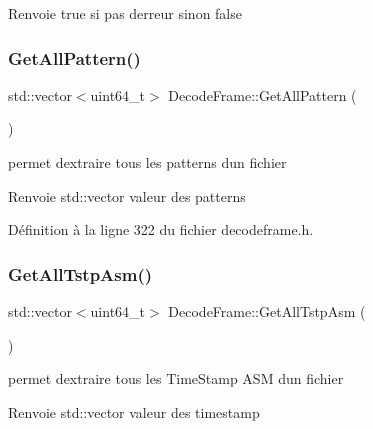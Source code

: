 \begin{DoxyReturn}{Renvoie}
true si pas d\textquotesingle{}erreur sinon false 
\end{DoxyReturn}
\mbox{\label{class_decode_frame_a86005f4e7d6746978adc98b07e444d1c}} 
\subsubsection{\texorpdfstring{Get\+All\+Pattern()}{GetAllPattern()}}
{\footnotesize\ttfamily std\+::vector$<$uint64\+\_\+t$>$ Decode\+Frame\+::\+Get\+All\+Pattern (\begin{DoxyParamCaption}{ }\end{DoxyParamCaption})\hspace{0.3cm}{\ttfamily [inline]}}



permet d\textquotesingle{}extraire tous les patterns d\textquotesingle{}un fichier 

\begin{DoxyReturn}{Renvoie}
std\+::vector valeur des patterns 
\end{DoxyReturn}


Définition à la ligne 322 du fichier decodeframe.\+h.

\mbox{\label{class_decode_frame_a0b3030ee5fcf599dfc15efa03b007a2d}} 
\subsubsection{\texorpdfstring{Get\+All\+Tstp\+Asm()}{GetAllTstpAsm()}}
{\footnotesize\ttfamily std\+::vector$<$uint64\+\_\+t$>$ Decode\+Frame\+::\+Get\+All\+Tstp\+Asm (\begin{DoxyParamCaption}{ }\end{DoxyParamCaption})\hspace{0.3cm}{\ttfamily [inline]}}



permet d\textquotesingle{}extraire tous les Time\+Stamp A\+SM d\textquotesingle{}un fichier 

\begin{DoxyReturn}{Renvoie}
std\+::vector valeur des timestamp 
\end{DoxyReturn}


